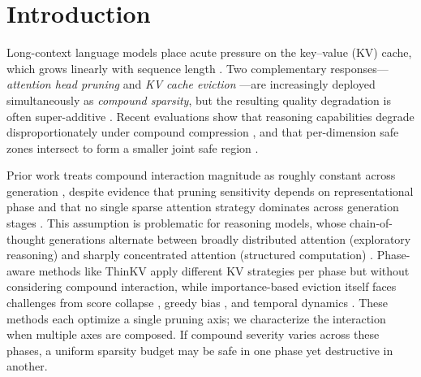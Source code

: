 \section{Introduction}
\label{sec:introduction}

Long-context language models place acute pressure on the key--value (KV) cache, which grows linearly with sequence length \cite{kwon-sosp2023, pope-mlsys2023}.
Two complementary responses---\emph{attention head pruning} \cite{voita-acl2019, michel-neurips2019} and \emph{KV cache eviction} \cite{snapkv-neurips2024, adakv-neurips2025}---are increasingly deployed simultaneously as \emph{compound sparsity}, but the resulting quality degradation is often super-additive \cite{spark-aaai2026, slim-icml2025}. Recent evaluations show that reasoning capabilities degrade disproportionately under compound compression \cite{unicomp-2026}, and that per-dimension safe zones intersect to form a smaller joint safe region \cite{phase-transition-compression-2026}.

Prior work treats compound interaction magnitude as roughly constant across generation \cite{spark-aaai2026, unicomp-2026}, despite evidence that pruning sensitivity depends on representational phase \cite{decision-repr-transition-2026} and that no single sparse attention strategy dominates across generation stages \cite{sparse-frontier-2025}.
This assumption is problematic for reasoning models, whose chain-of-thought generations \cite{wei-neurips2022-cot} alternate between broadly distributed attention (exploratory reasoning) and sharply concentrated attention (structured computation) \cite{thinkv-iclr2026}.
Phase-aware methods like ThinKV \cite{thinkv-iclr2026} apply different KV strategies per phase but without considering compound interaction, while importance-based eviction itself faces challenges from score collapse \cite{hies-2025}, greedy bias \cite{greedy-bias-kvcache-2026}, and temporal dynamics \cite{lethe-aaai2026}. These methods each optimize a single pruning axis; we characterize the interaction when multiple axes are composed.
If compound severity varies across these phases, a uniform sparsity budget may be safe in one phase yet destructive in another.

